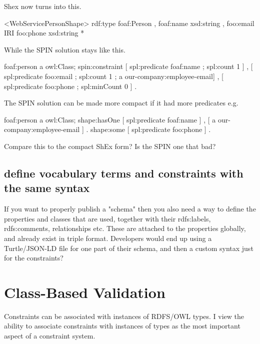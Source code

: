 \documentclass{llncs}
\begin{document}
Shex now turns into this.

\begin{ex}
<WebServicePersonShape> {
  rdf:type foaf:Person ,
  foaf:name xsd:string ,
  foo:email IRI %
  foo:phone xsd:string *
}
\end{ex}

While the SPIN solution stays like this.

\begin{ex}
foaf:person a owl:Class;
spin:constraint [ spl:predicate foaf:name ;
                  spl:count 1 ] ,
                [ spl:predicate foo:email ;
                  spl:count 1 ;
		  a our-company:employee-email] ,
                [ spl:predicate foo:phone ;
                  spl:minCount 0 ] .
\end{ex}

The SPIN solution can be made more compact if it had more predicates e.g.

\begin{ex}
foaf:person a owl:Class;
shape:hasOne  [ spl:predicate foaf:name  ] ,
	      [ a our-company:employee-email ] .
shape:some    [ spl:predicate foo:phone ] .
\end{ex}

Compare this to the compact ShEx form? Is the SPIN one that bad?

\subsection{define vocabulary terms and constraints with the same syntax}
If you want to properly publish a "schema" then 
you also need a way to define the properties and classes that are used, 
together with their rdfs:labels, rdfs:comments, relationships etc. These 
are attached to the properties globally, and already exist in triple 
format. Developers would end up using a Turtle/JSON-LD file for one part 
of their schema, and then a custom syntax just for the constraints? 

\section{Class-Based Validation}

Constraints can be associated with instances of RDFS/OWL types.  
I view the ability to associate constraints with instances of types as the most important aspect of a constraint system.
\end{document}
